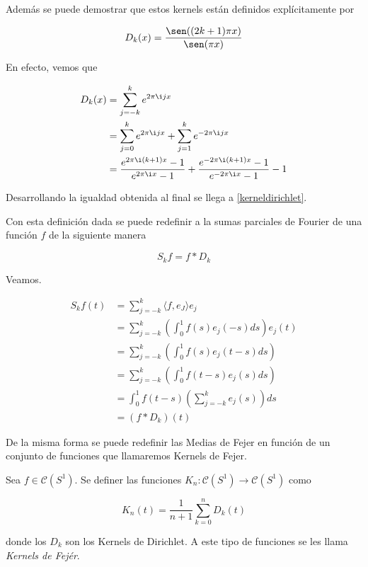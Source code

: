 Además se puede demostrar que estos kernels están definidos explícitamente por

\begin{equation}\label{kerneldirichlet}
D_k(x) = \frac{\sen ((2k+1)\pi x)}{\sen (\pi x)}
\end{equation}

En efecto, vemos que

\begin{align}
	D_k(x) &= \sum_{j=-k}^{k} e^{2\pi \i jx}\\
	&= \sum_{j=0}^{k} e^{2\pi \i jx} + \sum_{j=1}^{k} e^{-2\pi \i jx}\\
	&= \frac{e^{2\pi \i (k+1)x}-1}{e^{2\pi \i x} - 1} + \frac{e^{-2\pi \i (k+1)x}-1}{e^{-2\pi \i x} - 1} - 1
\end{align}

Desarrollando la igualdad obtenida al final se llega a \eqref{kerneldirichlet}.



Con esta definición dada se puede redefinir a la sumas parciales de Fourier de una función $f$ de la siguiente manera

\begin{equation}
	S_k f = f * D_k
\end{equation}

Veamos.

\begin{align}
	S_k f (t) &= \sum_{j=-k}^{k} \langle f,e_J \rangle e_j\\
	&= \sum_{j=-k}^{k} \left( \int_{0}^{1} f(s)e_j(-s)ds \right) e_j(t)\\
	&= \sum_{j=-k}^{k} \left( \int_{0}^{1} f(s) e_j(t-s)ds \right)\\
	&= \sum_{j=-k}^{k} \left( \int_{0}^{1} f(t-s) e_j(s) ds \right)\\
	&= \int_{0}^{1} f(t-s) \left( \sum_{j=-k}^{k} e_j (s) \right) ds\\
	&= (f * D_k)(t)
\end{align}

De la misma forma se puede redefinir las Medias de Fejer en función de un conjunto de funciones que llamaremos  Kernels de Fejer.

\begin{definicion}
	Sea $f \in \mathcal{C}(S^1)$. Se definer las funciones $K_n: \mathcal{C}(S^1) \rightarrow \mathcal{C}(S^1)$ como
	
	\begin{equation}
		K_n(t) = \frac{1}{n+1} \sum_{k=0}^{n} D_k(t)
	\end{equation} 
	
	donde los $D_k$ son los Kernels de Dirichlet. A este tipo de funciones se les llama \textit{Kernels de Fejér}.
\end{definicion}

